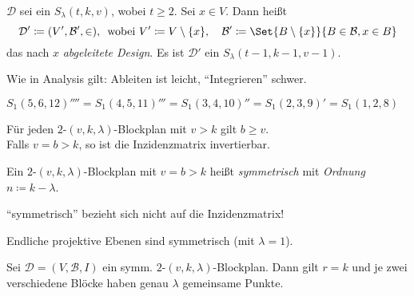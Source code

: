 \documentclass{cheat-sheet}
\newcommand{\Design}{\mathcal{D}} %
\newcommand{\Blocks}{\mathcal{B}} %
\begin{document}
\begin{defn}
  $\Design$ sei ein $S_\lambda(t, k, v)$, wobei $t \geq 2$.
  Sei $x \in V$.
  Dann heißt
  \[
    \Design' \coloneqq (V', \Blocks', \in),
    \enspace \text{wobei } V' \coloneqq V \setminus \{ x \},
    \quad \Blocks' \coloneqq \Set{B \setminus \{ x \}}{B \in \Blocks, x \in B}
  \]
  das nach $x$ \emph{abgeleitete Design}.
  Es ist $\Design'$ ein $S_\lambda(t-1, k-1, v-1)$.
\end{defn}

\begin{bem}
  Wie in Analysis gilt: Ableiten ist leicht, "`Integrieren"' schwer.
\end{bem}

\begin{bsp}
  $S_1(5,6,12)'''' = S_1(4,5,11)''' = S_1(3,4,10)'' = S_1(2,3,9)' = S_1(1,2,8)$
\end{bsp}



\begin{lem}
  Für jeden $2$-$(v,k,\lambda)$-Blockplan mit $v \!>\! k$ gilt $b \geq v$. \\
  Falls $v = b > k$, so ist die Inzidenzmatrix invertierbar.
\end{lem}

\begin{defn}
  Ein $2$-$(v, k, \lambda)$-Blockplan mit $v = b > k$ heißt \emph{symmetrisch} mit \emph{Ordnung} $n \coloneqq k - \lambda$.
\end{defn}

\begin{acht}
  "`symmetrisch"' bezieht sich nicht auf die Inzidenzmatrix!
\end{acht}

\begin{bsp}
  Endliche projektive Ebenen sind symmetrisch (mit $\lambda = 1$).
\end{bsp}

\begin{satz}
  Sei $\Design = (V, \Blocks, I)$ ein symm. $2$-$(v, k, \lambda)$-Blockplan.
  Dann gilt $r = k$ und je zwei verschiedene Blöcke haben genau $\lambda$ gemeinsame Punkte.
\end{satz}
\end{document}
